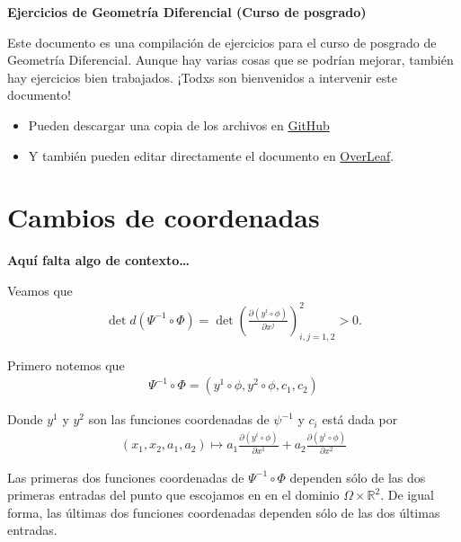 \documentclass[11pt]{article}
\begin{document}
	
	\begin{center}
		{\Large \bf Ejercicios de Geometría Diferencial (Curso de posgrado)}
	\end{center}
	\vspace{0.3cm}
	Este documento es una compilación de ejercicios para el curso de posgrado de Geometría Diferencial. Aunque hay varias cosas que se podrían mejorar, también hay ejercicios bien trabajados. ¡Todxs son bienvenidos a intervenir este documento!
	\begin{itemize}
		\item Pueden descargar una copia de los archivos en \href{https://github.com/danimalabares/geo-dif-exercises}{GitHub}
		\item Y también pueden editar directamente el documento en \href{https://www.overleaf.com/2426362393jhtzyfnpbmdy}{OverLeaf}.
	\end{itemize}
	
	
	\tableofcontents
	\newpage
	\section{Cambios de coordenadas}
	\textbf{Aquí falta algo de contexto…}\vspace{1cm}
	
	Veamos que
	\begin{align*}
		\det d(\Psi^{-1}\circ\Phi)= \det \left(\frac{\partial (y^i\circ \phi)}{\partial x^j}\right)_{i,j=1,2}^2 > 0.
	\end{align*}
	
	Primero notemos que 
	\begin{align*}
		\Psi^{-1}\circ\Phi=(y^1\circ\phi,y^2\circ\phi,c_1,c_2)
	\end{align*}
	\par Donde $y^1$ y $y^2$ son las funciones coordenadas de $\psi^{-1}$ y $c_i$ está dada por
	\begin{align*}
		(x_1,x_2,a_1,a_2)\mapsto a_1\frac{\partial (y^i\circ \phi)}{\partial x^1}+a_2\frac{\partial (y^i\circ \phi)}{\partial x^2}
	\end{align*}
	\par Las primeras dos funciones coordenadas de $\Psi^{-1}\circ\Phi$ dependen sólo de las dos primeras entradas del punto que escojamos en en el dominio $\Omega\times\mathbb{R}^2$. De igual forma, las últimas dos funciones coordenadas dependen sólo de las dos últimas entradas.
	
\end{document}
